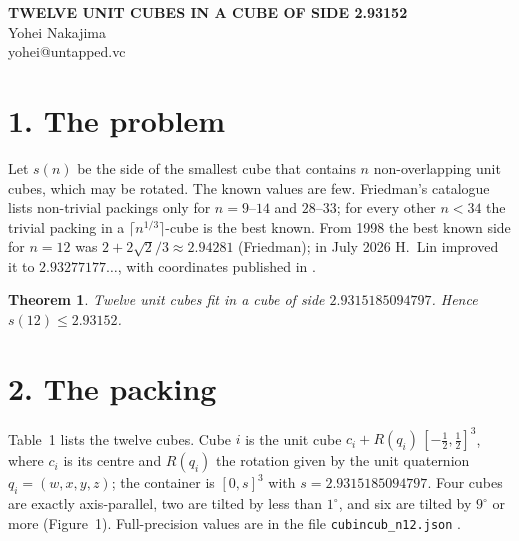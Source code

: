 \documentclass[11pt]{article}
\newtheorem*{theorem}{Theorem}
\begin{document}
\thispagestyle{empty}
\begin{center}
{\fontsize{14}{17}\selectfont\bfseries TWELVE UNIT CUBES IN A CUBE OF SIDE 2.93152}\\[6pt]
Yohei Nakajima\\
{\small yohei@untapped.vc}
\end{center}

\begin{abstract}\noindent
We give a packing of 12 non-overlapping unit cubes in a cube of side $2.9315185094797$, with every pair of cubes and every wall at least $10^{-6}$ apart. The previous best known side was $2.9327717687\ldots$ (H.~Lin, July 2026). The packing was found by compressing unit-diameter balls in a shrinking box and hardening them into cubes under continued inward pressure. Coordinates, a short verifier and an exact certificate are public.
\end{abstract}

\section*{1. The problem}
Let $s(n)$ be the side of the smallest cube that contains $n$ non-overlapping unit cubes, which may be rotated. The known values are few. Friedman's catalogue \cite{friedman} lists non-trivial packings only for $n=9$--$14$ and $28$--$33$; for every other $n<34$ the trivial packing in a $\lceil n^{1/3}\rceil$-cube is the best known. From 1998 the best known side for $n=12$ was $2+2\sqrt2/3\approx2.94281$ (Friedman); in July 2026 H.~Lin improved it to $2.93277177\ldots$, with coordinates published in \cite{hyra}.

\begin{theorem}
Twelve unit cubes fit in a cube of side $2.9315185094797$. Hence $s(12)\le 2.93152$.
\end{theorem}

\section*{2. The packing}
Table~1 lists the twelve cubes. Cube $i$ is the unit cube $c_i + R(q_i)\,[-\tfrac12,\tfrac12]^3$, where $c_i$ is its centre and $R(q_i)$ the rotation given by the unit quaternion $q_i=(w,x,y,z)$; the container is $[0,s]^3$ with $s=2.9315185094797$. Four cubes are exactly axis-parallel, two are tilted by less than $1^\circ$, and six are tilted by $9^\circ$ or more (Figure~1). Full-precision values are in the file \texttt{cubincub\_n12.json} \cite{repo}.
\end{document}
